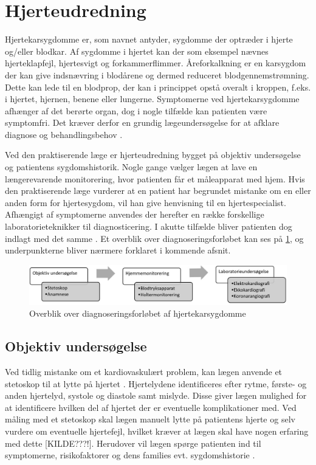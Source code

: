 \section{Hjerteudredning}
Hjertekarsygdomme er, som navnet antyder, sygdomme der optræder i hjerte og/eller blodkar. Af sygdomme i hjertet kan der som eksempel nævnes hjerteklapfejl, hjertesvigt og forkammerflimmer. Åreforkalkning er en karsygdom der kan give indsnævring i blodårene og dermed reduceret blodgennemstrømning. Dette kan lede til en blodprop, der kan i princippet opstå overalt i kroppen, f.eks. i hjertet, hjernen, benene eller lungerne. Symptomerne ved hjertekarsygdomme afhænger af det berørte organ, dog i nogle tilfælde kan patienten være symptomfri. Det kræver derfor en grundig lægeundersøgelse for at afklare diagnose og behandlingsbehov \cite{apoteket}. 

Ved den praktiserende læge er hjerteudredning bygget på objektiv undersøgelse og patientens sygdomshistorik. Nogle gange vælger lægen at lave en længerevarende monitorering, hvor patienten får et måleapparat med hjem. Hvis den praktiserende læge vurderer at en patient har begrundet mistanke om en eller anden form for hjertesygdom, vil han give henvisning til en hjertespecialist. Afhængigt af symptomerne anvendes der herefter en række forskellige laboratorieteknikker til diagnosticering. I akutte tilfælde bliver patienten dog indlagt med det samme \cite{hjerud}. Et overblik over diagnoseringsforløbet kan ses på \ref{fig:forloeb}, og underpunkterne bliver nærmere forklaret i kommende afsnit.

\begin{figure}[H] %
\begin{center}
\includegraphics[width=1\textwidth]{figures/forloeb}
\end{center}
\caption{Overblik over diagnoseringsforløbet af hjertekarsygdomme}
\label{fig:forloeb}
\end{figure}

\subsection{Objektiv undersøgelse}
Ved tidlig mistanke om et kardiovaskulært problem, kan lægen anvende et stetoskop til at lytte på hjertet \cite{subob}. Hjertelydene identificeres efter rytme, første- og anden hjertelyd, systole og diastole samt mislyde. Disse giver lægen mulighed for at identificere hvilken del af hjertet der er eventuelle komplikationer med. Ved måling med et stetoskop skal lægen manuelt lytte på patientens hjerte og selv vurdere om eventuelle hjertefejl, hvilket kræver at lægen skal have nogen erfaring med dette [KILDE???!]. Herudover vil lægen spørge patienten ind til symptomerne, risikofaktorer og dens families evt. sygdomshistorie \cite{hjerud}. 
 

